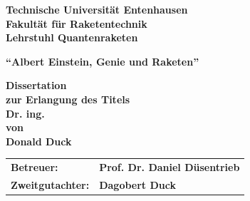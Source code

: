 
\begin{titlepage}
{\bfseries\Large Technische Universität Entenhausen \\ Fakultät für Raketentechnik \\ Lehrstuhl Quantenraketen}\vspace*{3cm}

\begin{center}
\LARGE\bfseries\enquote{Albert Einstein, Genie und Raketen}
\end{center}\vspace*{2cm}

\begin{center}
\LARGE\bfseries Dissertation\\ zur Erlangung des Titels\\ Dr. ing. \\ von \\ Donald Duck
\end{center}



%
\vfill
\begin{tabular}{p{}l}
\bfseries\large Betreuer: & \bfseries\large  Prof. Dr. Daniel Düsentrieb \\
\bfseries\large Zweitgutachter: & \bfseries\large  Dagobert Duck \\
\end{tabular}

\end{titlepage}